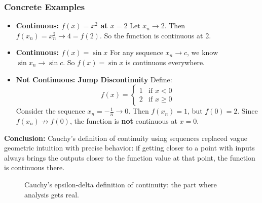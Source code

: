 \subsubsection{Concrete Examples}

\begin{itemize}
    \item \textbf{Continuous: \( f(x) = x^2 \) at \( x = 2 \)}  
    Let \( x_n \to 2 \). Then \( f(x_n) = x_n^2 \to 4 = f(2) \). So the function is continuous at 2.

    \item \textbf{Continuous: \( f(x) = \sin x \)}  
    For any sequence \( x_n \to c \), we know \( \sin x_n \to \sin c \). So \( f(x) = \sin x \) is continuous everywhere.

    \item \textbf{Not Continuous: Jump Discontinuity}  
    Define:
    \[
    f(x) = \begin{cases}
      1 & \text{if } x < 0 \\
      2 & \text{if } x \geq 0
    \end{cases}
    \]
    Consider the sequence \( x_n = -\frac{1}{n} \to 0 \). Then \( f(x_n) = 1 \), but \( f(0) = 2 \). Since \( f(x_n) \not\to f(0) \), the function is \textbf{not} continuous at \( x = 0 \).
\end{itemize}


\textbf{Conclusion:} Cauchy’s definition of continuity using sequences replaced vague geometric intuition with precise behavior: if getting closer to a point with inputs always brings the outputs closer to the function value at that point, the function is continuous there.


\begin{center}
\begin{figure}[H]
\centering
{}
\caption{Cauchy's epsilon-delta definition of continuity: the part where analysis gets real.}
\end{figure}
\end{center}






